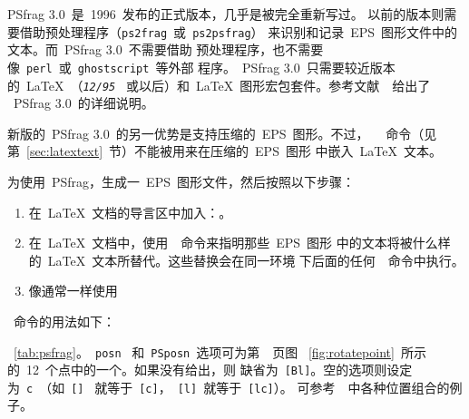 \textsf{PSfrag 3.0}~是~1996~发布的正式版本，几乎是被完全重新写过。
以前的版本则需要借助预处理程序（\texttt{ps2frag}~或~\texttt{ps2psfrag}）
来识别和记录~EPS~图形文件中的文本。而~\textsf{PSfrag 3.0}~不需要借助
预处理程序，也不需要像~\texttt{perl}~或~\texttt{ghostscript}~等外部
程序。~\textsf{PSfrag 3.0}~只需要较近版本的~\LaTeX{}~（\texttt{\textit{12/95}}
~或以后）和~\LaTeX{}~图形宏包套件。参考文献~\cite{psfrag}~给出了
~\textsf{PSfrag 3.0}~的详细说明。

新版的~\textsf{PSfrag 3.0}~的另一优势是支持压缩的~EPS~图形。不过，
~~命令（见第~\ref{sec:latextext}~节）不能被用来在压缩的~EPS~图形
中嵌入~\LaTeX{}~文本。

为使用~\textsf{PSfrag}，生成一~EPS~图形文件，然后按照以下步骤：
\begin{enumerate}
\item 在~\LaTeX{}~文档的导言区中加入：。
\item 在~\LaTeX{}~文档中，使用~~命令来指明那些~EPS~图形
      中的文本将被什么样的~\LaTeX{}~文本所替代。这些替换会在同一环境
      下后面的任何~~命令中执行。
\item 像通常一样使用~
\end{enumerate}

~命令的用法如下：

{\large\hspace{1cm}
}

~\ref{tab:psfrag}。~\texttt{posn}~
和~\texttt{PSposn}~选项可为第~\pageref{fig:rotatepoint}~页图~
\ref{fig:rotatepoint}~所示的~12~个点中的一个。如果没有给出，则
缺省为~\texttt{[Bl]}。空的选项则设定为~\texttt{c}~（如~\texttt{[]}~
就等于~\texttt{[c]}，~\texttt{[l]}~就等于~\texttt{[lc]}）。
可参考~\cite{psfrag}~中各种位置组合的例子。

